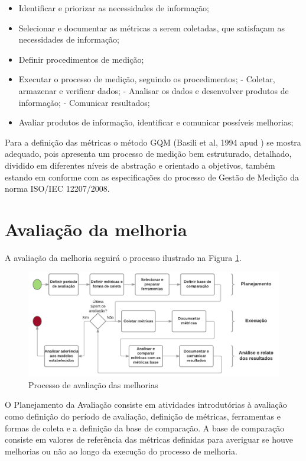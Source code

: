 \begin{itemize}
 \item Identificar e priorizar as necessidades de informação;
 \item Selecionar e documentar as métricas a serem coletadas, que satisfaçam as necessidades de informação;
 \item Definir procedimentos de medição;
 \item Executar o processo de medição, seguindo os procedimentos;
    \subitem - Coletar, armazenar e verificar dados;
    \subitem - Analisar os dados e desenvolver produtos de informação;
    \subitem - Comunicar resultados;
 \item Avaliar produtos de informação, identificar e comunicar possíveis melhorias;
\end{itemize}

Para a definição das métricas o método GQM (Basili et al, 1994 apud \cite{solingen99}) se mostra adequado, 
pois apresenta um processo de medição bem estruturado, detalhado, dividido em diferentes níveis de abstração
e orientado a objetivos, também estando em conforme com as especificações do processo de Gestão de Medição
da norma ISO/IEC 12207/2008.

\section{Avaliação da melhoria}

A avaliação da melhoria seguirá o processo ilustrado na Figura \ref{fig:processo_avaliacao}.

\begin{figure}[!ht]
\centering
\includegraphics[scale=0.4]{figuras/processo_avaliacao.png}
\caption{Processo de avaliação das melhorias}
\label{fig:processo_avaliacao}
\end{figure}

O Planejamento da Avaliação consiste em atividades introdutórias à avaliação como definição do período de avaliação,
definição de métricas, ferramentas e formas de coleta e a definição da base de comparação. A base de comparação consiste
em valores de referência das métricas definidas para averiguar se houve melhorias ou não ao longo da execução do processo de melhoria.

